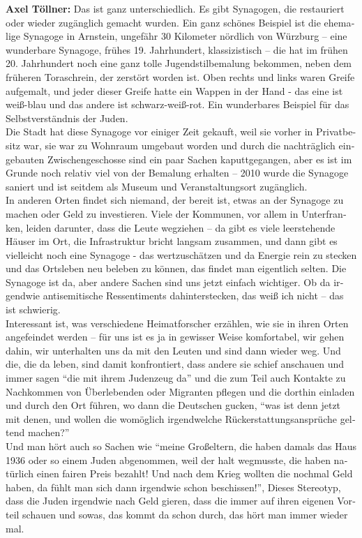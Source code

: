\begin{otherlanguage}{ngerman}
\textbf{Axel Töllner:} Das ist ganz unterschiedlich. Es gibt Synagogen, die restauriert oder wieder zugänglich gemacht wurden. Ein ganz schönes Beispiel ist die ehemalige Synagoge in Arnstein, ungefähr 30 Kilometer nördlich von Würzburg – eine wunderbare Synagoge, frühes 19. Jahrhundert, klassizistisch – die hat im frühen 20. Jahrhundert noch eine ganz tolle Jugendstilbemalung bekommen, neben dem früheren Toraschrein, der zerstört worden ist. Oben rechts und links waren Greife aufgemalt, und jeder dieser Greife hatte ein Wappen in der Hand - das eine ist weiß-blau und das andere ist schwarz-weiß-rot. Ein wunderbares Beispiel für das Selbstverständnis der Juden.\\ 
Die Stadt hat diese Synagoge vor einiger Zeit gekauft, weil sie vorher in Privatbesitz war, sie war zu Wohnraum umgebaut worden und durch die nachträglich eingebauten Zwischengeschosse sind ein paar Sachen kaputtgegangen, aber es ist im Grunde noch relativ viel von der Bemalung erhalten – 2010 wurde die Synagoge saniert und ist seitdem als Museum und Veranstaltungsort zugänglich.\\ 
In anderen Orten findet sich niemand, der bereit ist, etwas an der Synagoge zu machen oder Geld zu investieren. Viele der Kommunen, vor allem in Unterfranken, leiden darunter, dass die Leute wegziehen – da gibt es viele leerstehende Häuser im Ort, die Infrastruktur bricht langsam zusammen, und dann gibt es vielleicht noch eine Synagoge - das wertzuschätzen und da Energie rein zu stecken und das Ortsleben neu beleben zu können, das findet man eigentlich selten. Die Synagoge ist da, aber andere Sachen sind uns jetzt einfach wichtiger. Ob da irgendwie antisemitische Ressentiments dahinterstecken, das weiß ich nicht – das ist schwierig.\\ 
Interessant ist, was verschiedene Heimatforscher erzählen, wie sie in ihren Orten angefeindet werden – für uns ist es ja in gewisser Weise komfortabel, wir gehen dahin, wir unterhalten uns da mit den Leuten und sind dann wieder weg. Und die, die da leben, sind damit konfrontiert, dass andere sie schief anschauen und immer sagen "`die mit ihrem Judenzeug da"' und die zum Teil auch Kontakte zu Nachkommen von Überlebenden oder Migranten pflegen und die dorthin einladen und durch den Ort führen, wo dann die Deutschen gucken, "`was ist denn jetzt mit denen, und wollen die womöglich irgendwelche Rückerstattungsansprüche geltend machen?"'\\ 
Und man hört auch so Sachen wie "`meine Großeltern, die haben damals das Haus 1936 oder so einem Juden abgenommen, weil der halt wegmusste, die haben natürlich einen fairen Preis bezahlt! Und nach dem Krieg wollten die nochmal Geld haben, da fühlt man sich dann irgendwie schon beschissen!"', Dieses Stereotyp, dass die Juden irgendwie nach Geld gieren, dass die immer auf ihren eigenen Vorteil schauen und sowas, das kommt da schon durch, das hört man immer wieder mal.\\ 

\end{otherlanguage}
